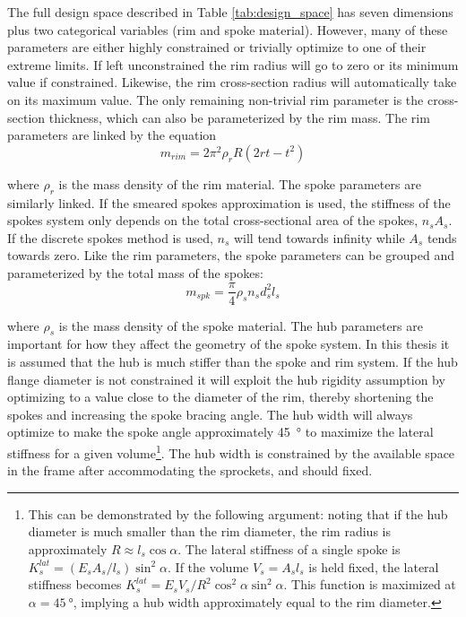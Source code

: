 \documentclass[\rootdir/thesis.tex]{subfiles}
\begin{document}
The full design space described in Table \ref{tab:design_space} has seven dimensions plus two categorical variables (rim and spoke material). However, many of these parameters are either highly constrained or trivially optimize to one of their extreme limits. If left unconstrained the rim radius will go to zero or its minimum value if constrained. Likewise, the rim cross-section radius will automatically take on its maximum value. The only remaining non-trivial rim parameter is the cross-section thickness, which can also be parameterized by the rim mass. The rim parameters are linked by the equation
\begin{equation}
\label{eq:m_rim}
m_{rim} = 2\pi^2 \rho_r R (2rt - t^2)
\end{equation}

where $\rho_r$ is the mass density of the rim material. The spoke parameters are similarly linked. If the smeared spokes approximation is used, the stiffness of the spokes system only depends on the total cross-sectional area of the spokes, $n_sA_s$. If the discrete spokes method is used, $n_s$ will tend towards infinity while $A_s$ tends towards zero. Like the rim parameters, the spoke parameters can be grouped and parameterized by the total mass of the spokes:
\begin{equation}
\label{eq:m_spokes}
m_{spk} = \frac{\pi}{4} \rho_s n_s d_s^2 l_s
\end{equation}

where $\rho_s$ is the mass density of the spoke material. The hub parameters are important for how they affect the geometry of the spoke system. In this thesis it is assumed that the hub is much stiffer than the spoke and rim system. If the hub flange diameter is not constrained it will exploit the hub rigidity assumption by optimizing to a value close to the diameter of the rim, thereby shortening the spokes and increasing the spoke bracing angle. The hub width will always optimize to make the spoke angle approximately \SI{45}{\degree} to maximize the lateral stiffness for a given volume\footnote{This can be demonstrated by the following argument: noting that if the hub diameter is much smaller than the rim diameter, the rim radius is approximately $R \approx l_s \cos{\alpha}$. The lateral stiffness of a single spoke is $K_s^{lat} = (E_sA_s/l_s)\sin^2{\alpha}$. If the volume $V_s=A_sl_s$ is held fixed, the lateral stiffness becomes $K_s^{lat} = E_sV_s/R^2 \cos^2{\alpha}\sin^2{\alpha}$. This function is maximized at $\alpha=\SI{45}{\degree}$, implying a hub width approximately equal to the rim diameter.}. The hub width is constrained by the available space in the frame after accommodating the sprockets, and should fixed.
\end{document}

